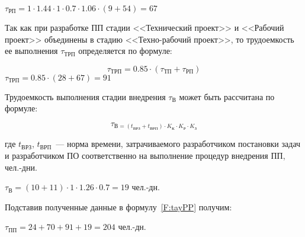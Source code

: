 $\tau_{\text{РП}} = 1 \cdot 1.44 \cdot 1 \cdot 0.7 \cdot 1.06 \cdot (9 + 54) = 67$

Так как при разработке ПП стадии <<Технический проект>> и <<Рабочий проект>> объединены в стадию <<Техно-рабочий проект>>, то трудоемкость ее выполнения $\tau_{\text{ТРП}}$ определяется по формуле:

\begin{equation}
\tau_{\text{ТРП}} = 0.85 \cdot (\tau_{\text{ТП}} + \tau_{\text{РП}})
\label{F:tauTRP}
\end{equation}
$\tau_{\text{ТРП}} = 0.85 \cdot (28 + 67) = 91$


Трудоемкость выполнения стадии внедрения $\tau_{\text{В}}$ может быть рассчитана по формуле:

\begin{equation}
\tau_{\text{В} = (t_{\text{ВРЗ}} + t_{\text{ВРП}}) \cdot K_{\text{К}} \cdot K_{\text{Р}} \cdot K_{\text{З}}}
\label{F:tauV}
\end{equation}

где $t_{\text{ВРЗ}}$, $t_{\text{ВРП}}$~--- норма времени, затрачиваемого разработчиком постановки задач и разработчиком ПО соответственно на выполнение процедур внедрения ПП, чел.-дни.

$\tau_{\text{В}} = (10 + 11) \cdot 1 \cdot 1.26 \cdot 0.7 = 19$ чел.-дн.

Подставив полученные данные в формулу~\ref{F:tayPP} получим:

$\tau_{\text{ПП}} = 24 + 70 + 91 + 19 = 204$ чел.-дн.

